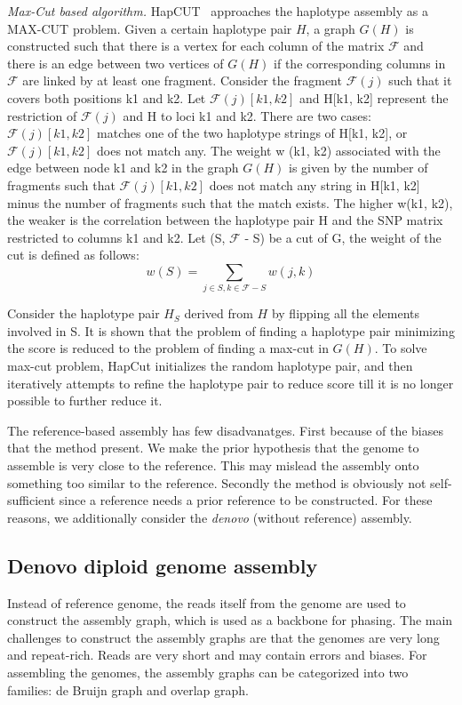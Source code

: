 \textit{Max-Cut based algorithm.}
HapCUT~\citep{BB08_hapcut} approaches the haplotype assembly as a MAX-CUT problem.
Given a certain haplotype pair $H$, a graph $G(H)$ is constructed such that there is a vertex for each column of the matrix $\mathcal{F}$ and 
there is an edge between two vertices of $G(H)$ if the corresponding columns in $\mathcal{F}$ are linked by at least one fragment. 
Consider the fragment $\mathcal{F}(j)$ such that it covers both positions k1 and k2. Let $\mathcal{F}(j)[k1,k2]$ and H[k1, k2] represent the restriction of  $\mathcal{F}(j)$ and H to loci k1 and k2. 
There are two cases: $\mathcal{F}(j)[k1,k2]$ matches one of the two haplotype strings of H[k1, k2], or $\mathcal{F}(j)[k1,k2]$ does not match any. 
The weight w (k1, k2) associated with the edge between node k1 and k2 in the graph $G(H)$ is given by the number of fragments such that $\mathcal{F}(j)[k1,k2]$ does not match any string in 
H[k1, k2] minus the number of fragments such that the match exists. 
The higher w(k1, k2), the weaker is the correlation between the haplotype pair H and the SNP matrix restricted to columns k1 and k2. 
Let (S, $\mathcal{F}$ - S) be a cut of G, the weight of the cut is defined as follows:
\[ w(S) = \sum_{j\in S,k\in \mathcal{F}- S} w(j,k)\]

Consider the haplotype pair $H_S$ derived from $H$ by flipping all the elements involved in S. It is shown that the problem of finding a haplotype pair minimizing the \MEC score
is reduced to the problem of finding a max-cut in $G(H)$. To solve max-cut problem, HapCut initializes the random haplotype pair, and then iteratively attempts to refine the haplotype pair to reduce \MEC score
till it is no longer possible to further reduce it.


The reference-based assembly has few disadvanatges. First because of the biases that the method present.
We make the prior hypothesis that the genome to assemble is very close to the reference.
This may mislead the assembly onto something too similar to the reference. Secondly
the method is obviously not self-sufficient since a reference needs a prior reference to be
constructed. For these reasons, we additionally consider the \textit{denovo} (without reference) assembly. 


\subsection{Denovo diploid genome assembly}
Instead of reference genome, the reads itself from the genome are used to construct the assembly graph, which is used as a backbone for phasing. 
The main challenges to construct the assembly graphs are that the genomes are very long and repeat-rich. Reads are very short and may contain errors and biases.
For assembling the genomes, the assembly graphs can be categorized into two families: de Bruijn graph and overlap graph.

